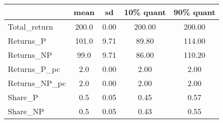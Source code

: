 \begin{tabular}{lcccc}
\toprule
{} &   mean &    sd &  10\% quant &  90\% quant \\
\midrule
Total\_return  &  200.0 &  0.00 &     200.00 &     200.00 \\
Returns\_P     &  101.0 &  9.71 &      89.80 &     114.00 \\
Returns\_NP    &   99.0 &  9.71 &      86.00 &     110.20 \\
Returns\_P\_pc  &    2.0 &  0.00 &       2.00 &       2.00 \\
Returns\_NP\_pc &    2.0 &  0.00 &       2.00 &       2.00 \\
Share\_P       &    0.5 &  0.05 &       0.45 &       0.57 \\
Share\_NP      &    0.5 &  0.05 &       0.43 &       0.55 \\
\bottomrule
\end{tabular}
